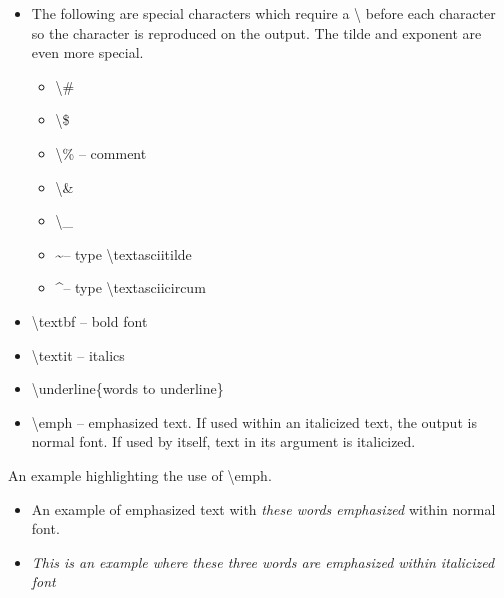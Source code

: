 \begin{spacing}{2.0}
\begin{itemize}
    \item The following are special characters which require a \textbackslash{} before each character so the character is reproduced on the output. The tilde and exponent are even more special. 
    \begin{itemize}
        \item \textbackslash{\#}
        \item \textbackslash{\$}
        \item \textbackslash{\%} -- comment
        \item \textbackslash{\&}
        \item \textbackslash{\_}
        \item \textasciitilde -- type \textbackslash{textasciitilde}
        \item \textasciicircum -- type \textbackslash{textasciicircum}
    \end{itemize}
    \item \textbackslash{textbf} -- bold font
    \item \textbackslash{textit} -- italics
    \item \textbackslash{underline\{words to underline\}}
    \item \textbackslash{emph} -- emphasized text. If used within an italicized text, the output is normal font. If used by itself, text in its argument is italicized.
\end{itemize}
An example highlighting the use of \textbackslash{emph}.
\begin{itemize}
    \item An example of emphasized text with \emph{these words emphasized} within normal font.
    \item \textit{This is an example where \emph{these three words} are emphasized within italicized font}
\end{itemize}

\end{spacing}
\newpage


